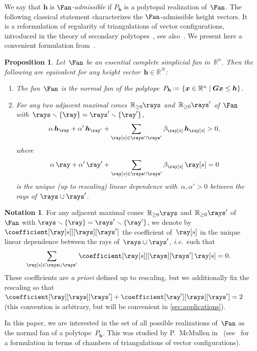 \documentclass{amsart}
\newtheorem{proposition}[theorem]{Proposition}
\theoremstyle{definition}
\newtheorem{notation}[theorem]{Notation}
\newcommand{\R}{\mathbb{R}} %
\renewcommand{\b}[1]{{\boldsymbol{#1}}} %
\newcommand{\set}[2]{\left\{ #1 \;\middle|\; #2 \right\}} %
\newcommand{\ssm}{\smallsetminus} %
\newcommand{\eqdef}{\mbox{\,\raisebox{0.2ex}{\scriptsize\ensuremath{\mathrm:}}\ensuremath{=}\,}} %
\newcommand{\ie}{\textit{i.e.}~} %
\newcommand{\apriori}{\textit{a priori}} %
\newcommand{\darkblue}{\color{darkblue}} %
\newcommand{\defn}[1]{\textsl{\darkblue #1}} %
\begin{document}
We say that $\b{h}$ is \defn{$\Fan$-admissible} if $P_\b{h}$ is a polytopal realization of~$\Fan$.
The following classical statement characterizes the $\Fan$-admissible height vectors.
It is a reformulation of regularity of triangulations of vector configurations, introduced in the theory of secondary polytopes~\cite{GelfandKapranovZelevinsky}, see also~\cite{DeLoeraRambauSantos}.
We present here a convenient formulation from~\cite[Lem.~2.1]{ChapotonFominZelevinsky}.

\begin{proposition}
\label{prop:characterizationPolytopalFan}
Let~$\Fan$ be an essential complete simplicial fan in~$\R^n$. Then the following are equivalent for any height vector~$\b{h}\in \R^N$:
\begin{enumerate}
\item The fan~$\Fan$ is the normal fan of the polytope~$P_\b{h} \eqdef \set{\b{x} \in \R^n}{\b{G}\b{x} \le \b{h}}$.
\item For any two adjacent maximal cones~$\R_{\ge0}\rays$ and~$\R_{\ge0}\rays'$ of~$\Fan$ with~$\rays \ssm \{\ray\} = \rays' \ssm \{\ray'\}$,
\[
\alpha \, \b{h}_{\ray} + \alpha' \, \b{h}_{\ray'} + \sum_{\ray[s] \in \rays \cap \rays'} \beta_{\ray[s]} \, \b{h}_{\ray[s]} > 0,
\]
where
\[
\alpha \, \ray + \alpha' \, \ray' + \sum_{\ray[s] \in \rays \cap \rays'} \beta_{\ray[s]} \, \ray[s] = 0
\]
is the unique (up to rescaling) linear dependence with~$\alpha, \alpha' > 0$ between the rays of~$\rays \cup \rays'$.
\end{enumerate}
\end{proposition}

\begin{notation}
For any adjacent maximal cones~$\R_{\ge0}\rays$ and~$\R_{\ge0}\rays'$ of~$\Fan$ with ${\rays \ssm \{\ray\} = \rays' \ssm \{\ray'\}}$, we denote by~$\coefficient[{\ray[s]}][\rays][\rays']$ the coefficient of~$\ray[s]$ in the unique linear dependence between the rays of~$\rays \cup \rays'$, \ie such that
\[
\sum_{\ray[s] \in \rays \cup \rays'} \coefficient[{\ray[s]}][\rays][\rays'] \, \ray[s] = 0.
\]
These coefficients are \apriori{} defined up to rescaling, but we additionally fix the rescaling so that~${\coefficient[\ray][\rays][\rays'] + \coefficient[\ray'][\rays][\rays'] = 2}$ (this convention is arbitrary, but will be convenient in \cref{sec:applications}).
\end{notation}

In this paper, we are interested in the set of all possible realizations of~$\Fan$ as the normal fan of a polytope~$P_\b{h}$. This was studied by P.~McMullen in~\cite{McMullen-typeCone} (see~\cite[Sect.~9.5]{DeLoeraRambauSantos} for a formulation in terms of chambers of triangulations of vector configurations).
\end{document}
